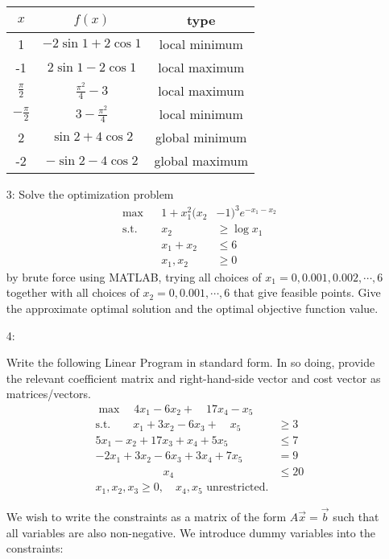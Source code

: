 \documentclass{article}
\begin{document}
\begin{itemize}
\begin{soln}
\begin{center}
				\begin{tabular}{c|c|c}
					$x$ & $f(x)$ & type \\
					\hline
					1 & $-2\sin 1+2\cos 1$ & local minimum \\
					-1 & $2\sin 1 - 2\cos 1$ & local maximum \\
					$\frac{\pi}{2}$ & $\frac{\pi^2}{4} - 3$ & local maximum \\
					$-\frac{\pi}{2}$ & $3-\frac{\pi^2}{4}$ & local minimum \\
					2 & $\sin 2 + 4\cos 2$ & global minimum \\
					-2 & $-\sin2-4\cos2$ & global maximum
				\end{tabular}
			\end{center}
		\end{soln}


	\item[3:] Solve the optimization problem
		\begin{align*}
			\max & & 1+x_1^2(x_2&-1)^3 e^{-x_1-x_2} \\
			\text{s.t.} & & x_2&\ge\log x_1 \\
			& &x_1+x_2 &\le 6 \\
			& &x_1, x_2 &\ge 0
		\end{align*} by brute force using MATLAB, trying all choices of $x_1=0, 0.001, 0.002, \cdots, 6$ together with all choices of $x_2=0, 0.001, \cdots, 6$ that give feasible points. Give the approximate optimal solution and the optimal objective function value.

	\item[4:] 
		\begin{enumerate}[a)]
			\ii Write the following Linear Program in standard form. In so doing, provide the relevant coefficient matrix and right-hand-side vector and cost vector as matrices/vectors.
			\begin{align*}
				\max\quad 4x_1-6x_2+\quad17x_4-x_5 & \\
				\text{s.t.}\quad\quad x_1+3x_2-6x_3+\quad x_5 &\ge 3 \\
				5x_1-x_2+17x_3+x_4+5x_5 &\le 7 \\
				-2x_1+3x_2-6x_3+3x_4+7x_5 &= 9 \\
				\quad\quad\quad\quad\quad\quad x_4\quad &\le 20 \\
				x_1, x_2, x_3\ge 0, \quad x_4, x_5 \text{ unrestricted.}
			\end{align*}

			\begin{soln}
				We wish to write the constraints as a matrix of the form $A\vec{x}=\vec{b}$ such that all variables are also non-negative. We introduce dummy variables into the constraints:


\end{soln}
\end{enumerate}
\end{itemize}
\end{document}
